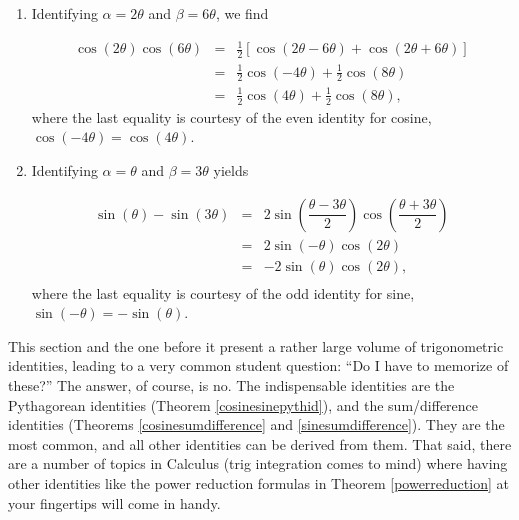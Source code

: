{\begin{enumerate}

\item  Identifying $\alpha = 2\theta$ and $\beta = 6\theta$, we find

\[\begin{array}{rcl}

\cos(2\theta)\cos(6\theta) & = &  \frac{1}{2} \left[ \cos(2\theta - 6\theta) + \cos(2\theta + 6\theta)\right]\\ [4pt]
													 & = & \frac{1}{2} \cos(-4\theta) + \frac{1}{2}\cos(8\theta) \\ [4pt]
													 & = & \frac{1}{2} \cos(4\theta) + \frac{1}{2} \cos(8\theta), \end{array} \]
where the last equality is courtesy of the even identity for cosine, $\cos(-4\theta) = \cos(4\theta)$.

\item  Identifying $\alpha = \theta$ and $\beta = 3\theta$ yields

\[ \begin{array}{rcl}

\sin(\theta) - \sin(3\theta) & = &  2 \sin\left( \dfrac{\theta - 3\theta}{2}\right)\cos\left( \dfrac{\theta + 3\theta}{2}\right) \\ [2pt]
														 & = &  2 \sin\left( -\theta \right)\cos\left( 2\theta \right) \\ [2pt]
															& = &  -2 \sin\left( \theta \right)\cos\left( 2\theta \right), \\ \end{array}\]
where the last equality is courtesy of the odd identity for sine, $\sin(-\theta) = -\sin(\theta)$.

\end{enumerate}}

\medskip

This section and the one before it present a rather large volume of trigonometric identities, leading to a very common student question: ``Do I have to memorize  of these?'' The answer, of course, is no. The indispensable identities are the Pythagorean identities (Theorem \ref{cosinesinepythid}), and the sum/difference identities (Theorems \ref{cosinesumdifference} and \ref{sinesumdifference}). They are the most common, and all other identities can be derived from them. That said, there are a number of topics in Calculus (trig integration comes to mind) where having other identities like the power reduction formulas in Theorem \ref{powerreduction} at your fingertips will come in handy.

